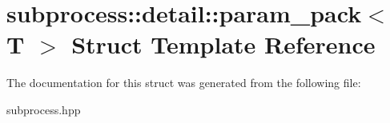 \hypertarget{structsubprocess_1_1detail_1_1param__pack}{}\section{subprocess\+:\+:detail\+:\+:param\+\_\+pack$<$ T $>$ Struct Template Reference}
\label{structsubprocess_1_1detail_1_1param__pack}


The documentation for this struct was generated from the following file\+:\begin{DoxyCompactItemize}
\item 
subprocess.\+hpp\end{DoxyCompactItemize}

